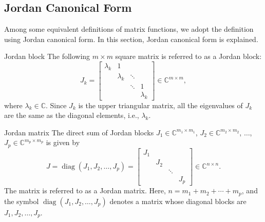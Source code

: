 \subsection{{Jordan Canonical Form}}\label{sec:jordan-canonical-form}

{Among some equivalent definitions of matrix functions, we adopt the definition using Jordan canonical form. In this section, Jordan canonical form is explained.}

\begin{Definition}{{Jordan block}}\label{def:jordan-block}
{The following $m\times m$ square matrix is referred to as a Jordan block:}
\[
J_k=\begin{bmatrix}\lambda_k&1&&\\&\lambda_k&\ddots&\\&&\ddots&1\\&&&\lambda_k\end{bmatrix}\in\mathbb{C}^{m\times m},
\]
{where $\lambda_k\in\mathbb{C}$. Since $J_k$ is the upper triangular matrix, all the eigenvalues of $J_k$ are the same as the diagonal elements, i.e., $\lambda_k$.}
\end{Definition}

\begin{Definition}{{Jordan matrix}}\label{def:jordan-matrix}
{The direct sum of Jordan blocks $J_1\in\mathbb{C}^{m_1\times m_1}$, $J_2\in\mathbb{C}^{m_2\times m_2}$, $\ldots$, $J_p\in\mathbb{C}^{m_p\times m_p}$ is given by}
\begin{equation}\label{eq:jordan-block-diagonal}
J=\operatorname{diag}(J_1,J_2,\ldots,J_p)=\begin{bmatrix}J_1&&&\\&J_2&&\\&&\ddots&\\&&&J_p\end{bmatrix}\in\mathbb{C}^{n\times n}.
\end{equation}
{The matrix is referred to as a Jordan matrix. Here, $n=m_1+m_2+\cdots+m_p$, and the symbol $\operatorname{diag}(J_1,J_2,\ldots,J_p)$ denotes a matrix whose diagonal blocks are $J_1,J_2,\ldots,J_p$.}
\end{Definition}

